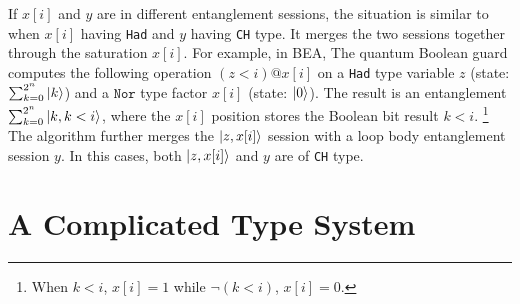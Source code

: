 If $x[i]$ and $y$ are in different entanglement sessions,
the situation is similar to when $x[i]$ having \texttt{Had} and $y$ having \texttt{CH} type.
It merges the two sessions together through the saturation $x[i]$.
For example, in BEA, The quantum Boolean guard computes the following operation $(z < i) @ x[i]$
on a \texttt{Had} type variable $z$ (state: $\sum_{k=0}^{2^n}\left\vert{k}\right\rangle$)
and a $\texttt{Nor}$ type factor $x[i]$ (state: $\left\vert{0}\right\rangle$).
The result is an entanglement $\sum_{k=0}^{2^n}\left\vert{k,k < i}\right\rangle$,
where the $x[i]$ position stores the Boolean bit result $k < i$. \footnote{When $k<i$, $x[i]=1$ while $\neg (k<i)$, $x[i]=0$.}
The algorithm further merges the $\left\vert{z,x[i]}\right\rangle$ session with a loop body entanglement session $y$. 
In this cases, both $\left\vert{z,x[i]}\right\rangle$ and $y$ are of \texttt{CH} type. 


\section{A Complicated Type System}\label{sec:newtype}

